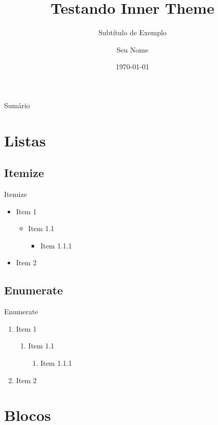 \documentclass[aspectratio=169]{beamer}
\title{Testando Inner Theme}
\subtitle{Subtítulo de Exemplo}
\author{Seu Nome}
\institute{Sua Instituição}
\date{\today}
\begin{document}
\maketitle

\begin{frame}{Sumário}

\tableofcontents
    
\end{frame}

\section{Listas}

\subsection{Itemize}
\begin{frame}{Itemize}
\begin{itemize}
    \item Item 1
    \begin{itemize}
        \item Item 1.1
        \begin{itemize}
            \item Item 1.1.1
        \end{itemize}
    \end{itemize}
    \item Item 2
\end{itemize}
\end{frame}

\subsection{Enumerate}
\begin{frame}{Enumerate}
\begin{enumerate}
    \item Item 1
    \begin{enumerate}
        \item Item 1.1
        \begin{enumerate}
            \item Item 1.1.1
        \end{enumerate}
    \end{enumerate}
    \item Item 2
\end{enumerate}
\end{frame}

\section{Blocos}
\end{document}
